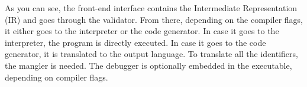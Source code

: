 As you can see, the front-end interface contains the Intermediate Representation (IR) and goes through the validator.
From there, depending on the compiler flags, it either goes to the interpreter or the code generator.
In case it goes to the interpreter, the program is directly executed.
In case it goes to the code generator, it is translated to the output language.
To translate all the identifiers, the mangler is needed.
The debugger is optionally embedded in the executable, depending on compiler flags.

